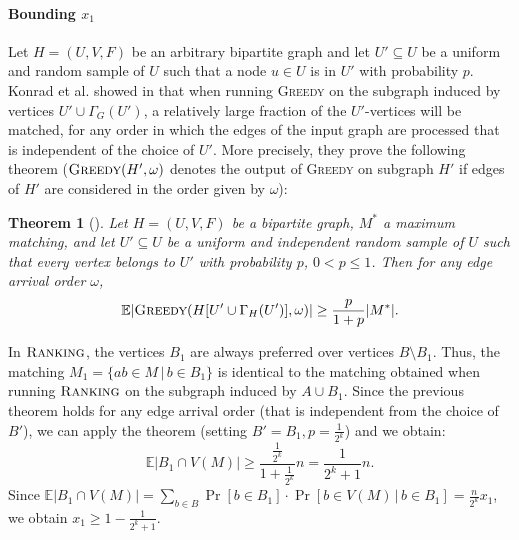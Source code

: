 \documentclass[a4paper]{article}
\newcommand{\Exp}{\mathbb{E}}
\newcommand{\Rank}{\textsc{Ranking}}
\newcommand{\Greedy}{\textsc{Greedy}}
\newtheorem{theorem}{Theorem}
\begin{document}
\paragraph*{Bounding $x_1$}
Let $H=(U, V, F)$ be an arbitrary bipartite graph and let $U' \subseteq U$ be a uniform and random sample of $U$
such that a node $u \in U$ is in $U'$ with probability $p$. Konrad et al. showed in \cite{kmm12} that when
running \textsc{Greedy} on the subgraph induced by vertices $U' \cup \Gamma_G(U')$, a relatively large fraction
of the $U'$-vertices will be matched, for any order in which the edges of the input graph
are processed that is independent of the choice of $U'$. More precisely, they prove the following theorem
($\Greedy(H', \omega)$ denotes the output of \textsc{Greedy} on subgraph $H'$ if
edges of $H'$ are considered in the order given by $\omega$):
\begin{theorem}[\cite{kmm12}]
 Let $H = (U, V, F)$ be a bipartite graph, $M^*$ a maximum matching, and let $U' \subseteq U$ be a uniform and independent random sample
 of $U$ such that every vertex belongs to $U'$ with probability $p$, $0 < p \le 1$. Then for any edge arrival
 order $\omega$, $$\Exp |\Greedy(H[U' \cup \Gamma_H(U')], \omega)| \ge \frac{p}{1+p} |M^*|.$$
\end{theorem}
In $\Rank$, the vertices $B_1$ are always preferred over vertices $B \setminus B_1$. Thus,
the matching $M_1 = \{ ab \in M \, | \, b \in B_1 \}$ is identical to the matching obtained
when running $\Rank$ on the subgraph induced by $A \cup B_1$. Since the previous theorem
holds for any edge arrival order (that is independent from the choice of $B'$), we can apply
the theorem (setting $B' = B_1, p = \frac{1}{2^k}$) and we obtain:
$$\Exp |B_1 \cap V(M) | \ge \frac{\frac{1}{2^k}}{1 + \frac{1}{2^k}} n = \frac{1}{2^k + 1} n.$$
Since $\Exp |B_1 \cap V(M) | = \sum_{b \in B} \Pr \left[b \in B_1 \right] \cdot
\Pr \left[ b \in V(M) \, | \, b \in B_1 \right] = \frac{n}{2^k} x_1$, we obtain $x_1 \ge 1 - \frac{1}{2^k + 1}$.
\end{document}
